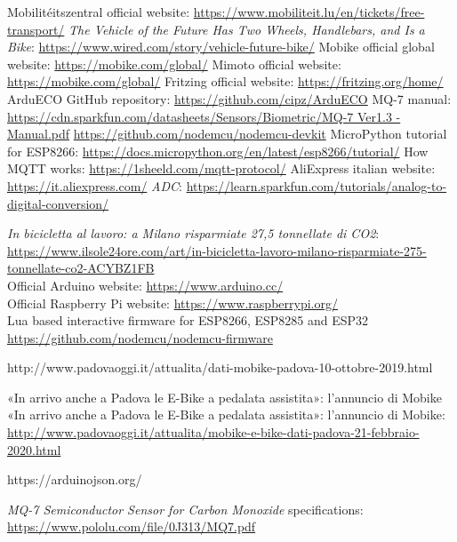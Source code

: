 \begin{thebibliography}{00}
	
 Mobilitéitszentral official website:  \url{https://www.mobiliteit.lu/en/tickets/free-transport/}
 \textit{The Vehicle of the Future Has Two Wheels, Handlebars, and Is a Bike}:  \url{https://www.wired.com/story/vehicle-future-bike/}
 Mobike official global website: \url{https://mobike.com/global/}
 Mimoto official website: \url{https://mobike.com/global/}
 Fritzing official website: \href{https://fritzing.org/home/}{https://fritzing.org/home/}
 ArduECO GitHub repository:  \href{https://github.com/cipz/ArduECO}{https://github.com/cipz/ArduECO}
 MQ-7 manual: \href{https://cdn.sparkfun.com/datasheets/Sensors/Biometric/MQ-7 Ver1.3 - Manual.pdf}{https://cdn.sparkfun.com/datasheets/Sensors/Biometric/MQ-7 Ver1.3 - Manual.pdf}
 \href{https://github.com/nodemcu/nodemcu-devkit}{https://github.com/nodemcu/nodemcu-devkit}
 MicroPython tutorial for ESP8266: \url{https://docs.micropython.org/en/latest/esp8266/tutorial/}
 How MQTT works:  \href{https://1sheeld.com/mqtt-protocol/}{https://1sheeld.com/mqtt-protocol/}
 AliExpress italian website: \href{https://it.aliexpress.com/}{https://it.aliexpress.com/}
 \textit{ADC}:  \url{https://learn.sparkfun.com/tutorials/analog-to-digital-conversion/}

\vspace{3cm}



 \textit{In bicicletta al lavoro: a Milano risparmiate 27,5 tonnellate di CO2}:  \url{https://www.ilsole24ore.com/art/in-bicicletta-lavoro-milano-risparmiate-275-tonnellate-co2-ACYBZ1FB}\\

 Official Arduino website: \url{https://www.arduino.cc/}\\

 Official Raspberry Pi website: \url{https://www.raspberrypi.org/}\\
	
 Lua based interactive firmware for ESP8266, ESP8285 and ESP32 \url{https://github.com/nodemcu/nodemcu-firmware}

http://www.padovaoggi.it/attualita/dati-mobike-padova-10-ottobre-2019.html



 «In arrivo anche a Padova le E-Bike a pedalata assistita»: l'annuncio di Mobike «In arrivo anche a Padova le E-Bike a pedalata assistita»: l'annuncio di Mobike:  \href{http://www.padovaoggi.it/attualita/mobike-e-bike-dati-padova-21-febbraio-2020.html}{http://www.padovaoggi.it/attualita/mobike-e-bike-dati-padova-21-febbraio-2020.html}

https://arduinojson.org/

 \textit{MQ-7 Semiconductor Sensor for Carbon Monoxide} specifications:  \url{https://www.pololu.com/file/0J313/MQ7.pdf }

	
\end{thebibliography}
